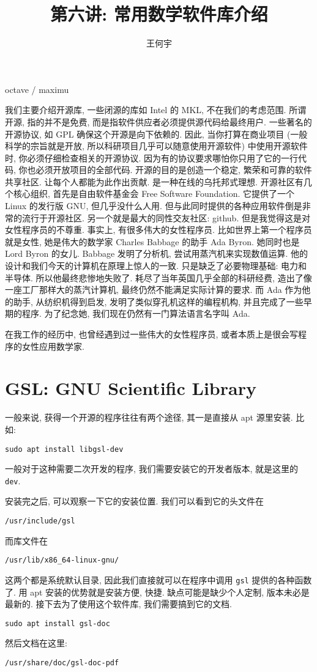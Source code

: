 \documentclass[a4paper]{ctexart}
\title{第六讲: 常用数学软件库介绍}
\author{王何宇}
\date{}
\begin{document}
\maketitle
\pagestyle{empty}

octave / maximu

我们主要介绍开源库, 一些闭源的库如 Intel 的 MKL, 不在我们的考虑范围. 所谓开源, 指的并不是免费,
而是指软件供应者必须提供源代码给最终用户. 一些著名的开源协议, 如 GPL 确保这个开源是向下依赖的.
因此, 当你打算在商业项目 (一般科学的宗旨就是开放, 所以科研项目几乎可以随意使用开源软件)
中使用开源软件时, 你必须仔细检查相关的开源协议. 因为有的协议要求哪怕你只用了它的一行代码,
你也必须开放项目的全部代码. 开源的目的是创造一个稳定, 繁荣和可靠的软件共享社区. 让每个人都能为此作出贡献.
是一种在线的乌托邦式理想. 开源社区有几个核心组织, 首先是自由软件基金会 Free Software Foundation.
它提供了一个 Linux 的发行版 GNU, 但几乎没什么人用. 但与此同时提供的各种应用软件倒是非常的流行于开源社区.
另一个就是最大的同性交友社区: github. 但是我觉得这是对女性程序员的不尊重. 事实上, 有很多伟大的女性程序员.
比如世界上第一个程序员就是女性, 她是伟大的数学家 Charles Babbage 的助手 Ada Byron.
她同时也是 Lord Byron 的女儿. Babbage 发明了分析机, 尝试用蒸汽机来实现数值运算.
他的设计和我们今天的计算机在原理上惊人的一致. 只是缺乏了必要物理基础: 电力和半导体. 所以他最终悲惨地失败了.
耗尽了当年英国几乎全部的科研经费, 造出了像一座工厂那样大的蒸汽计算机, 最终仍然不能满足实际计算的要求.
而 Ada 作为他的助手, 从纺织机得到启发, 发明了类似穿孔机这样的编程机构, 并且完成了一些早期的程序.
为了纪念她, 我们现在仍然有一门算法语言名字叫 Ada.

在我工作的经历中, 也曾经遇到过一些伟大的女性程序员, 或者本质上是很会写程序的女性应用数学家. 

\section{GSL: GNU Scientific Library}
一般来说, 获得一个开源的程序往往有两个途径, 其一是直接从 apt 源里安装. 比如:
\begin{verbatim}
sudo apt install libgsl-dev
\end{verbatim}
一般对于这种需要二次开发的程序, 我们需要安装它的开发者版本, 就是这里的 \verb|dev|.

安装完之后, 可以观察一下它的安装位置. 我们可以看到它的头文件在
\begin{verbatim}
/usr/include/gsl
\end{verbatim}
而库文件在
\begin{verbatim}
/usr/lib/x86_64-linux-gnu/
\end{verbatim}
这两个都是系统默认目录, 因此我们直接就可以在程序中调用 \verb|gsl| 提供的各种函数了.
用 apt 安装的优势就是安装方便, 快捷. 缺点可能是缺少个人定制, 版本未必是最新的.
接下去为了使用这个软件库, 我们需要搞到它的文档.
\begin{verbatim}
sudo apt install gsl-doc
\end{verbatim}
然后文档在这里:
\begin{verbatim}
/usr/share/doc/gsl-doc-pdf
\end{verbatim}
\end{document}
